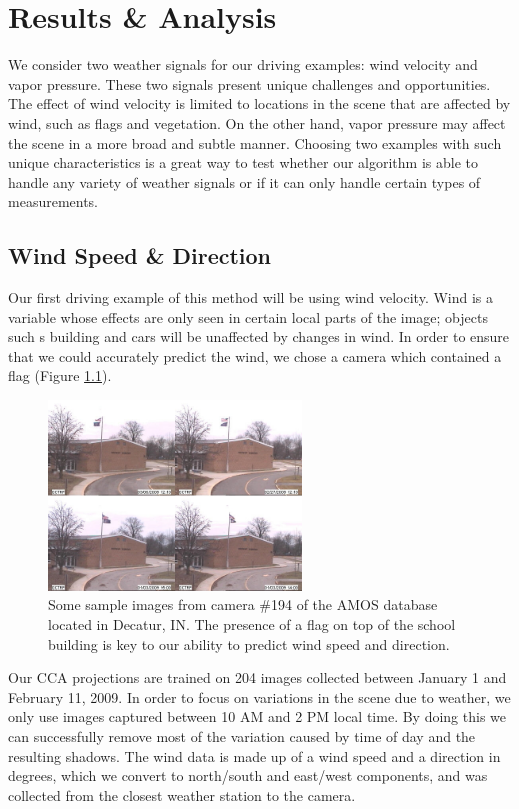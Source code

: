 \chapter{Results \& Analysis}
\label{cpt:results}
We consider two weather signals for our driving examples: wind velocity and vapor pressure. These two signals present unique challenges and opportunities. The effect of wind velocity is limited to locations in the scene that are affected by wind, such as flags and vegetation. On the other hand, vapor pressure may affect the scene in a more broad and subtle manner. Choosing two examples with such unique characteristics is a great way to test whether our algorithm is able to handle any variety of weather signals or if it can only handle certain types of measurements.

\section{Wind Speed \& Direction}
Our first driving example of this method will be using wind velocity. Wind is a variable whose effects are only seen in certain local parts of the image; objects such s building and cars will be unaffected by changes in wind. In order to ensure that we could accurately predict the wind, we chose a camera which contained a flag (Figure \ref{fig:windspeedextremes}). 
\begin{figure}
	\centering
		\includegraphics[width=0.60\textwidth]{figures/windspeedextremes.jpg}
	\caption{Some sample images from camera $\#$194 of the AMOS database located in Decatur, IN. The presence of a flag on top of the school building is key to our ability to predict wind speed and direction.}
	\label{fig:windspeedextremes}
\end{figure}
Our CCA projections are trained on 204 images collected between January 1 and February 11, 2009. In order to focus on variations in the scene due to weather, we only use images captured between 10 AM and 2 PM local time. By doing this we can successfully remove most of the variation caused by time of day and the resulting shadows. The wind data is made up of a wind speed and a direction in degrees, which we convert to north/south and east/west components, and was collected from the closest weather station to the camera. 


